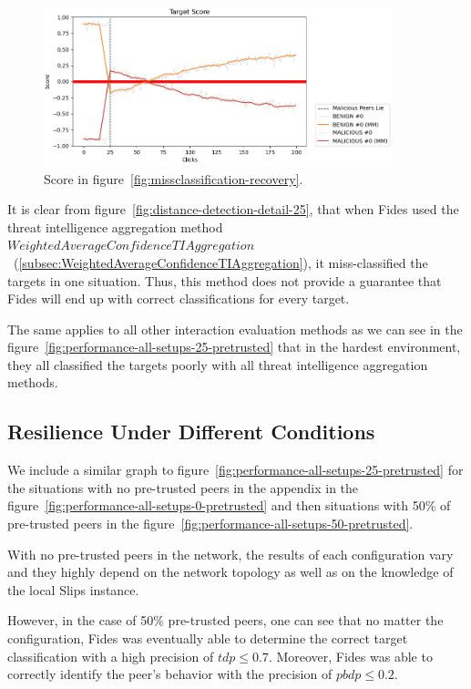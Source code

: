 \begin{figure}[ht]
    \centering
    \includegraphics[width=0.9\textwidth]{assets/misclassification_score.png}
    \caption{Score in figure~\ref{fig:missclassification-recovery}.}
    \label{fig:missclassification-score-only}
\end{figure}

It is clear from figure~\ref{fig:distance-detection-detail-25}, that when Fides used the threat intelligence aggregation method  $WeightedAverageConfidenceTIAggregation$~(\ref{subsec:WeightedAverageConfidenceTIAggregation}), it miss-classified the targets in one situation.
Thus, this method does not provide a guarantee that Fides will end up with correct classifications for every target.

The same applies to all other interaction evaluation methods as we can see in the figure~\ref{fig:performance-all-setups-25-pretrusted} that in the hardest environment, they all classified the targets poorly with all threat intelligence aggregation methods.

\subsection{Resilience Under Different Conditions}
\label{subsec:resilience-under-different-conditions}

We include a similar graph to figure~\ref{fig:performance-all-setups-25-pretrusted} for the situations with no pre-trusted peers in the appendix in the figure~\ref{fig:performance-all-setups-0-pretrusted} and then situations with 50\% of pre-trusted peers in the figure~\ref{fig:performance-all-setups-50-pretrusted}.

With no pre-trusted peers in the network, the results of each configuration vary and they highly depend on the network topology as well as on the knowledge of the local Slips instance.

However, in the case of 50\% pre-trusted peers, one can see that no matter the configuration, Fides was eventually able to determine the correct target classification with a high precision of $tdp \leq 0.7$. Moreover, Fides was able to correctly identify the peer's behavior with the precision of $pbdp \leq 0.2$.